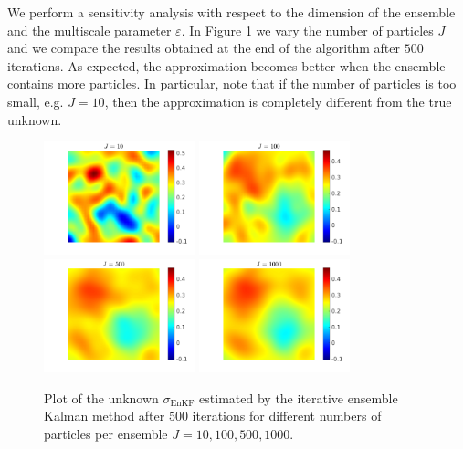 \documentclass[10pt]{article}
\begin{document}
We perform a sensitivity analysis with respect to the dimension of the ensemble and the multiscale parameter $\varepsilon$. In Figure \ref{fig:comparison_J} we vary the number of particles $J$ and we compare the results obtained at the end of the algorithm after $500$ iterations. As expected, the approximation becomes better when the ensemble contains more particles. In particular, note that if the number of particles is too small, e.g. $J = 10$, then the approximation is completely different from the true unknown.

\begin{figure}[t]
\centering
\includegraphics[width = 0.39\textwidth]{figures/ensemble_500_J10}
\includegraphics[width = 0.39\textwidth]{figures/ensemble_500_J100}
\\
\includegraphics[width = 0.39\textwidth]{figures/ensemble_500_J500}
\includegraphics[width = 0.39\textwidth]{figures/ensemble_500_J1000}
\caption{Plot of the unknown $\sigma_{\mathrm{EnKF}}$ estimated by the iterative ensemble Kalman method after $500$ iterations for different numbers of particles per ensemble $J = 10, 100, 500, 1000$.}
\label{fig:comparison_J}
\end{figure}
\end{document}
